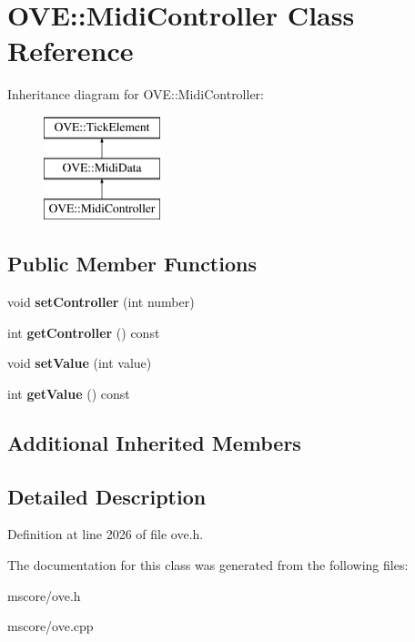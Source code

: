 \hypertarget{class_o_v_e_1_1_midi_controller}{}\section{O\+VE\+:\+:Midi\+Controller Class Reference}
\label{class_o_v_e_1_1_midi_controller}
Inheritance diagram for O\+VE\+:\+:Midi\+Controller\+:\begin{figure}[H]
\begin{center}
\leavevmode
\includegraphics[height=3.000000cm]{class_o_v_e_1_1_midi_controller}
\end{center}
\end{figure}
\subsection*{Public Member Functions}
\begin{DoxyCompactItemize}
\item 
\mbox{\label{class_o_v_e_1_1_midi_controller_a412d78aba7e220804b5a045423423938}} 
void {\bfseries set\+Controller} (int number)
\item 
\mbox{\label{class_o_v_e_1_1_midi_controller_a46728ca83c3f02f6198a0b090929a2f8}} 
int {\bfseries get\+Controller} () const
\item 
\mbox{\label{class_o_v_e_1_1_midi_controller_a0b32d6fb7763a2b2e57ac10641ea53ba}} 
void {\bfseries set\+Value} (int value)
\item 
\mbox{\label{class_o_v_e_1_1_midi_controller_a92ee5ba60664e424875d0c05fea9c652}} 
int {\bfseries get\+Value} () const
\end{DoxyCompactItemize}
\subsection*{Additional Inherited Members}


\subsection{Detailed Description}


Definition at line 2026 of file ove.\+h.



The documentation for this class was generated from the following files\+:\begin{DoxyCompactItemize}
\item 
mscore/ove.\+h\item 
mscore/ove.\+cpp\end{DoxyCompactItemize}
